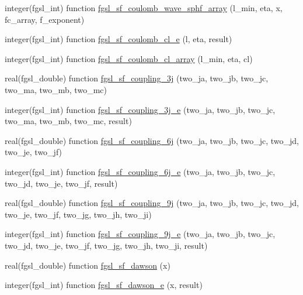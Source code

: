\begin{DoxyCompactItemize}
\item 
integer(fgsl\+\_\+int) function \hyperlink{specfunc_8finc_a5d75c634981c2fa24a96cc05dfea7a4e}{fgsl\+\_\+sf\+\_\+coulomb\+\_\+wave\+\_\+sphf\+\_\+array} (l\+\_\+min, eta, x, fc\+\_\+array, f\+\_\+exponent)
\item 
integer(fgsl\+\_\+int) function \hyperlink{specfunc_8finc_a99a2eb4d58b6aa34c2ee31b1a255d0ea}{fgsl\+\_\+sf\+\_\+coulomb\+\_\+cl\+\_\+e} (l, eta, result)
\item 
integer(fgsl\+\_\+int) function \hyperlink{specfunc_8finc_aaf0d00c9281111c48d430b56e6b275dc}{fgsl\+\_\+sf\+\_\+coulomb\+\_\+cl\+\_\+array} (l\+\_\+min, eta, cl)
\item 
real(fgsl\+\_\+double) function \hyperlink{specfunc_8finc_ae015149f5c9ca59e3031fe680d0e9881}{fgsl\+\_\+sf\+\_\+coupling\+\_\+3j} (two\+\_\+ja, two\+\_\+jb, two\+\_\+jc, two\+\_\+ma, two\+\_\+mb, two\+\_\+mc)
\item 
integer(fgsl\+\_\+int) function \hyperlink{specfunc_8finc_a3db589dce83b968f5b6621791e4e568a}{fgsl\+\_\+sf\+\_\+coupling\+\_\+3j\+\_\+e} (two\+\_\+ja, two\+\_\+jb, two\+\_\+jc, two\+\_\+ma, two\+\_\+mb, two\+\_\+mc, result)
\item 
real(fgsl\+\_\+double) function \hyperlink{specfunc_8finc_a959b7ee7f4c971f2054f116438fda348}{fgsl\+\_\+sf\+\_\+coupling\+\_\+6j} (two\+\_\+ja, two\+\_\+jb, two\+\_\+jc, two\+\_\+jd, two\+\_\+je, two\+\_\+jf)
\item 
integer(fgsl\+\_\+int) function \hyperlink{specfunc_8finc_a9847533ffaa754d197fbb6120badbeaf}{fgsl\+\_\+sf\+\_\+coupling\+\_\+6j\+\_\+e} (two\+\_\+ja, two\+\_\+jb, two\+\_\+jc, two\+\_\+jd, two\+\_\+je, two\+\_\+jf, result)
\item 
real(fgsl\+\_\+double) function \hyperlink{specfunc_8finc_a42140d537a50976fcb7da0a0853a612a}{fgsl\+\_\+sf\+\_\+coupling\+\_\+9j} (two\+\_\+ja, two\+\_\+jb, two\+\_\+jc, two\+\_\+jd, two\+\_\+je, two\+\_\+jf, two\+\_\+jg, two\+\_\+jh, two\+\_\+ji)
\item 
integer(fgsl\+\_\+int) function \hyperlink{specfunc_8finc_ac454227ac58ca2eff93e5fab56cb83a5}{fgsl\+\_\+sf\+\_\+coupling\+\_\+9j\+\_\+e} (two\+\_\+ja, two\+\_\+jb, two\+\_\+jc, two\+\_\+jd, two\+\_\+je, two\+\_\+jf, two\+\_\+jg, two\+\_\+jh, two\+\_\+ji, result)
\item 
real(fgsl\+\_\+double) function \hyperlink{specfunc_8finc_a26f4bdcc96e17a721cae630d62f2408b}{fgsl\+\_\+sf\+\_\+dawson} (x)
\item 
integer(fgsl\+\_\+int) function \hyperlink{specfunc_8finc_a1bfd7ee3ad93daa0cd3278f881e7ff20}{fgsl\+\_\+sf\+\_\+dawson\+\_\+e} (x, result)

\end{DoxyCompactItemize}
